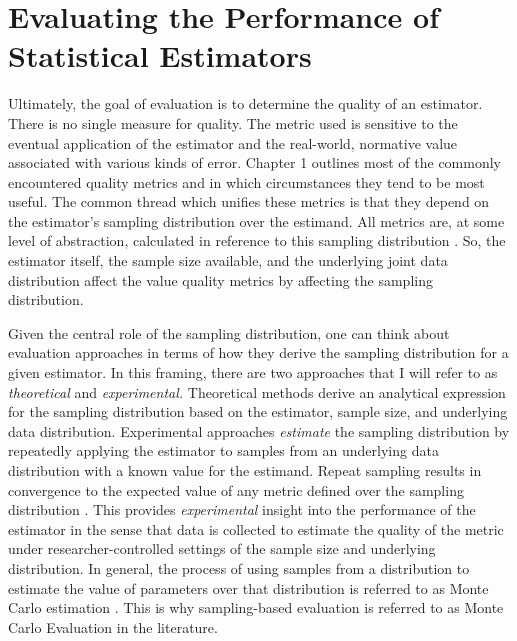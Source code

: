 \documentclass[../main.tex]{subfiles}
\begin{document}
\section{Evaluating the Performance of Statistical Estimators}

\vspace{\baselineskip}
Ultimately, the goal of evaluation is to determine the quality of an estimator. There is no single measure for quality. The metric used is sensitive to the eventual application of the estimator and the real-world, normative value associated with various kinds of error. \textcite{Bishop2006PatternLearning} Chapter 1 outlines most of the commonly encountered quality metrics and in which circumstances they tend to be most useful. The common thread which unifies these metrics is that they depend on the estimator's sampling distribution over the estimand. All metrics are, at some level of abstraction, calculated in reference to this sampling distribution \parencite{Calder1953StatisticalInference}. So, the estimator itself, the sample size available, and the underlying joint data distribution affect the value quality metrics by affecting the sampling distribution.\par


\vspace{\baselineskip}
Given the central role of the sampling distribution, one can think about evaluation approaches in terms of how they derive the sampling distribution for a given estimator. In this framing, there are two approaches that I will refer to as \textit{theoretical} and \textit{experimental.} Theoretical methods derive an analytical expression for the sampling distribution based on the estimator, sample size, and underlying data distribution. Experimental approaches \textit{estimate }the sampling distribution by repeatedly applying the estimator to samples from an underlying data distribution with a known value for the estimand. Repeat sampling results in convergence to the expected value of any metric defined over the sampling distribution \parencite{Paxton2001MonteImplementation}. This provides \textit{experimental} insight into the performance of the estimator in the sense that data is collected to estimate the quality of the metric under researcher-controlled settings of the sample size and underlying distribution. In general, the process of using samples from a distribution to estimate the value of parameters over that distribution is referred to as Monte Carlo estimation \parencite{Hastings1970MonteApplications}. This is why sampling-based evaluation is referred to as Monte Carlo Evaluation in the literature.\par
\end{document}
